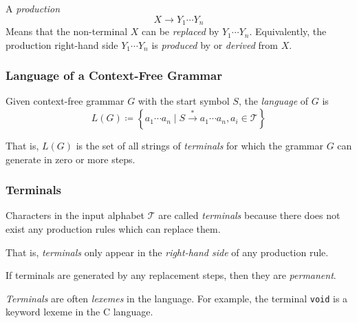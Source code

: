 \begin{example}
    A \textit{production}
    \begin{equation*}
        X \to Y_1 \cdots Y_n
    \end{equation*}
    Means that the non-terminal $X$ can be \textit{replaced} by $Y_1 \cdots Y_n$. Equivalently, the production right-hand side $Y_1 \cdots Y_n$ is \textit{produced} by or \textit{derived} from $X$.
\end{example}

\subsubsection{Language of a Context-Free Grammar}

\begin{definition}
    Given context-free grammar $G$ with the start symbol $S$, the \textit{language} of $G$ is
    \begin{equation}
        L(G) \coloneqq \left\lbrace a_1 \cdots a_n \mid S \xrightarrow{\ast} a_1 \cdots a_n, a_i \in \mathcal{T} \right\rbrace
    \end{equation}
    
    That is, $L(G)$ is the set of all strings of \textit{terminals} for which the grammar $G$ can generate in zero or more steps.
\end{definition}

\subsubsection{Terminals}

\begin{definition}[Terminals]
    Characters in the input alphabet $\mathcal{T}$ are called \textit{terminals} because there does not exist any production rules which can replace them.
    
    That is, \textit{terminals} only appear in the \textit{right-hand side} of any production rule.
\end{definition}

\begin{remark}
    If terminals are generated by any replacement steps, then they are \textit{permanent}.
    
    \textit{Terminals} are often \textit{lexemes} in the language. For example, the terminal \texttt{void} is a keyword lexeme in the C language.
\end{remark}
